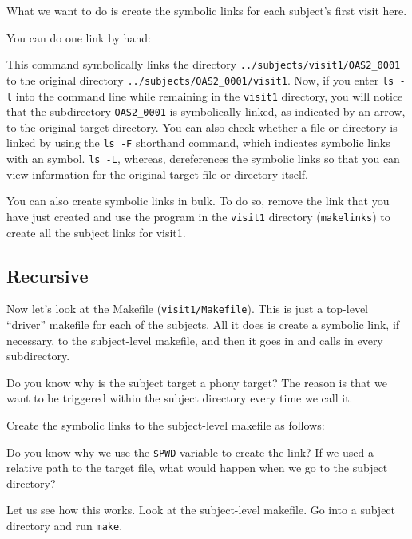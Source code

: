 What we want to do is create the symbolic links for each subject's first visit here. 

You can do one link by hand:

This command symbolically links the directory \texttt{../subjects/visit1/OAS2_0001} to the original directory \texttt{../subjects/OAS2_0001/visit1}. 
Now, if you enter \texttt{ls -l} into the command line while remaining in the \texttt{visit1} directory, you will notice that the subdirectory \texttt{OAS2_0001} is symbolically linked, as indicated by an arrow, to the original target directory. You can also check whether a file or directory is linked by using the \texttt{ls -F} shorthand command, which indicates symbolic links with an \@ symbol. \texttt{ls -L}, whereas, dereferences the symbolic links so that you can view information for the original target file or directory itself.

You can also create symbolic links in bulk. To do so, remove the link that you have just created and
use the program in the \texttt{visit1} directory (\texttt{makelinks}) to create all the subject links for visit1. 

\subsection{Recursive \maken{}}
Now let's look at the Makefile (\texttt{visit1/Makefile}).  This is just a 
top-level ``driver'' makefile for each of the subjects. All it does is
create a symbolic link, if necessary, to the subject-level makefile,
and then it goes in and calls \maken{} in every subdirectory.

Do you know why is the subject target a phony target? The reason is
that we want \maken{} to be triggered within the subject directory every
time we call it.

Create the symbolic links to the subject-level makefile as follows:

Do you know why we use the \texttt{\$PWD} variable to create the link?
If we used a relative path to the target file, what would happen when
we go to the subject directory?

Let us see how this works. Look at the subject-level makefile. Go into
a subject directory and run \texttt{make}.

